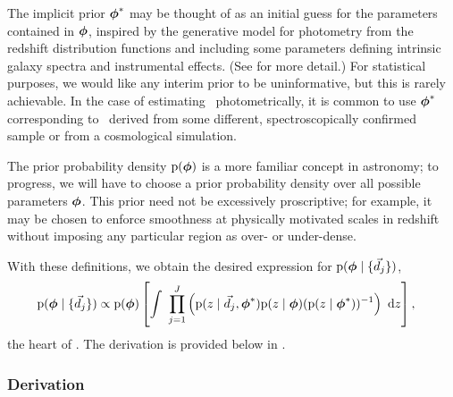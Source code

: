 The implicit prior ${\boldsymbol{\phi}}^{*}$ may be thought of as an initial guess for the parameters contained in ${\boldsymbol{\phi}}$, inspired by the generative model for photometry from the redshift distribution functions and including some parameters defining intrinsic galaxy spectra and instrumental effects. 
(See \citealt{Benitez2000} for more detail.)  
For statistical purposes, we would like any interim prior to be uninformative, but this is rarely achievable.  
In the case of estimating \nz\ photometrically, it is common to use ${\boldsymbol{\phi}}^{*}$ corresponding to \nz\ derived from some different, spectroscopically confirmed sample or from a cosmological simulation.

The prior probability density $\mathrm{p}({\boldsymbol{\phi}})$ is a more familiar concept in astronomy; to progress, we will have to choose a prior probability density over all possible parameters ${\boldsymbol{\phi}}$.
This prior need not be excessively proscriptive; for example, it may be chosen to enforce smoothness at physically motivated scales in redshift without imposing any particular region as over- or under-dense.

With these definitions, we obtain the desired expression for $\mathrm{p}({\boldsymbol{\phi}} \mid \{\vec{d}_{j}\})$,
\begin{align}
\begin{split}
\eqlabel{eqn:fullpost}
\pr{\ndphi \gvn \{\data_{j}\}} & \propto \pr{\ndphi}\left[\integral{\prod_{j=1}^{J} \left(\pr{z \gvn \data_{j}, \ndphi^{*}}\pr{z \gvn \ndphi}(\pr{z \gvn \ndphi^{*}})^{-1}\right)}{z}\right] ,
\end{split}
\end{align}
the heart of \Chippr.
The derivation is provided below in .

\subsubsection{Derivation}


